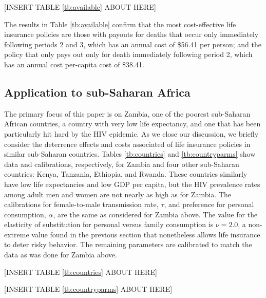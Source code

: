 \documentclass[12pt]{article}
\begin{document}
\begin{center}[INSERT TABLE \ref{tb:available} ABOUT HERE]\end{center}

The results in Table \ref{tb:available} confirm that the most cost-effective life insurance policies are those with payouts for deaths that occur only immediately following periods 2 and 3, which has an annual cost of \$56.41 per person; and the policy that only pays out only for death immediately following period 2, which has an annual cost per-capita cost of \$38.41.

\subsection{Application to sub-Saharan Africa}
The primary focus of this paper is on Zambia, one of the poorest sub-Saharan African countries, a country with very low life expectancy, and one that has been particularly hit hard by the HIV epidemic.  As we close our discussion, we briefly consider the deterrence effects and costs associated of life insurance policies in similar sub-Saharan countries.  Tables \ref{tb:countries} and \ref{tb:countryparms} show data and calibrations, respectively, for  Zambia and four other sub-Saharan countries: Kenya, Tanzania, Ethiopia, and Rwanda.  These countries similarly have low life expectancies and low GDP per capita, but the HIV prevalence rates among adult men and women are not nearly as high as for Zambia.  The calibrations for female-to-male transmission rate, $\tau$, and preference for personal consumption, $\alpha$, are the same as considered for Zambia above.  The value for the elasticity of substitution for personal versus family consumption is $\nu=2.0$, a non-extreme value found in the previous section that nonetheless allows life insurance to deter risky behavior.  The remaining parameters are calibrated to match the data as was done for Zambia above.

\begin{center}[INSERT TABLE \ref{tb:countries} ABOUT HERE]\end{center}
\begin{center}[INSERT TABLE \ref{tb:countryparms} ABOUT HERE]\end{center}
\end{document}

